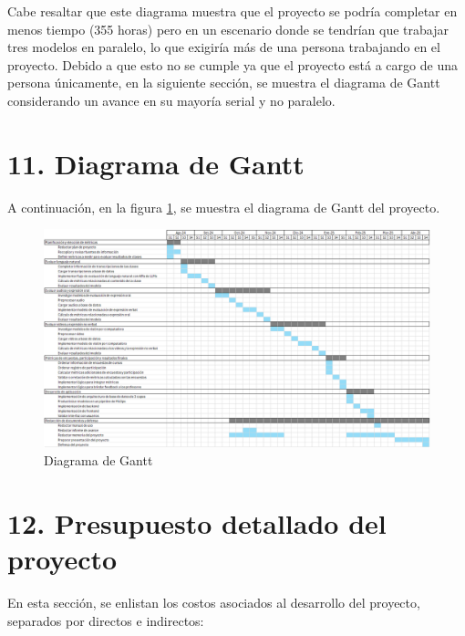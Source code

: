 \documentclass[
11pt, %
codirector, %
]{charter}
\begin{document}
Cabe resaltar que este diagrama muestra que el proyecto se podría completar en menos tiempo (355 horas) pero en un escenario donde se tendrían que trabajar tres modelos en paralelo, lo que exigiría más de una persona trabajando en el proyecto. Debido a que esto no se cumple ya que el proyecto está a cargo de una persona únicamente, en la siguiente sección, se muestra el diagrama de Gantt considerando un avance en su mayoría serial y no paralelo.

\section{11. Diagrama de Gantt}
\label{sec:gantt}

A continuación, en la figura \ref{fig:diagGantt}, se muestra el diagrama de Gantt del proyecto.

\begin{landscape}
\begin{figure}[htpb]
\centering 
\includegraphics[height=.9\textheight]{./Figuras/diagrama_gantt.png}
\caption{Diagrama de Gantt} %
\label{fig:diagGantt}
\end{figure}

\end{landscape}


\section{12. Presupuesto detallado del proyecto}
\label{sec:presupuesto}

En esta sección, se enlistan los costos asociados al desarrollo del proyecto, separados por directos e indirectos:
\end{document}
